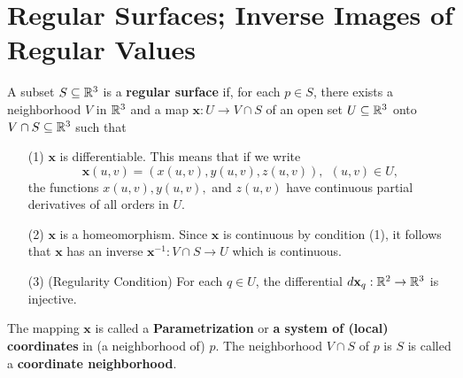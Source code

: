 \documentclass[a4paper]{article}
\begin{document}
\section{Regular Surfaces; Inverse Images of Regular Values}

\begin{definition}
    A subset \( S \subseteq \mathbb{R}^{3} \) is a \textbf{regular surface} if, for each \( p \in S  \), there exists a neighborhood \( V  \) in \( \mathbb{R}^{3} \) and a map \( \mathbf{x}: U \to V \cap S \) of an open set \( U \subseteq \mathbb{R}^{3} \) onto \( V \cap S \subseteq  \mathbb{R}^{3} \) such that 
    \begin{enumerate}
        \item[(1)] \( \mathbf{x} \) is differentiable. This means that if we write
            \[  \mathbf{x}(u,v) = (x(u,v), y(u,v), z(u,v)), \ \ (u,v) \in U, \]
            the functions \( x(u,v), y(u,v),  \) and \( z(u,v) \) have continuous partial derivatives of all orders in \( U  \).
        \item[(2)] \( \mathbf{x} \) is a homeomorphism. Since \( \mathbf{x} \) is continuous by condition (1), it follows that \( \mathbf{x} \) has an inverse \( \mathbf{x}^{-1} : V \cap S \to U  \) which is continuous.
        \item[(3)] (Regularity Condition) For each \( q \in U  \), the differential \( d {\mathbf{x}}_{q}: \mathbb{R}^{2} \to \mathbb{R}^{3}  \) is injective.
    \end{enumerate}
\end{definition}

\begin{definition}[Parametrization]
    The mapping \( \mathbf{x}    \) is called a \textbf{Parametrization} or \textbf{a system of (local) coordinates} in (a neighborhood of) \( p \). The neighborhood \( V \cap S  \) of \( p  \) is \( S  \) is called a \textbf{coordinate neighborhood}.
\end{definition}
\end{document}
